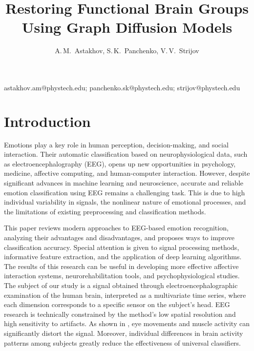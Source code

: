 \documentclass[12pt, twoside]{article}
\begin{document}
\title
    {Restoring Functional Brain Groups Using Graph Diffusion Models}
\author
    {A.\,M.~Astakhov, S.\,K.~Panchenko, V.\,V.~Strijov} 
\email
    {astakhov.am@phystech.edu; panchenko.sk@phystech.edu; strijov@phystech.edu}

\maketitle
\par

\section{Introduction}

Emotions play a key role in human perception, decision-making, and social interaction. Their automatic classification based on neurophysiological data, such as electroencephalography (EEG), opens up new opportunities in psychology, medicine, affective computing, and human-computer interaction. However, despite significant advances in machine learning and neuroscience, accurate and reliable emotion classification using EEG remains a challenging task. This is due to high individual variability in signals, the nonlinear nature of emotional processes, and the limitations of existing preprocessing and classification methods.

This paper reviews modern approaches to EEG-based emotion recognition, analyzing their advantages and disadvantages, and proposes ways to improve classification accuracy. Special attention is given to signal processing methods, informative feature extraction, and the application of deep learning algorithms. The results of this research can be useful in developing more effective affective interaction systems, neurorehabilitation tools, and psychophysiological studies. The subject of our study is a signal obtained through electroencephalographic examination of the human brain, interpreted as a multivariate time series, where each dimension corresponds to a specific sensor on the subject's head. EEG research is technically constrained by the method's low spatial resolution and high sensitivity to artifacts. As shown in \cite{1}, eye movements and muscle activity can significantly distort the signal. Moreover, individual differences in brain activity patterns among subjects greatly reduce the effectiveness of universal classifiers.
\end{document}
